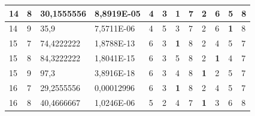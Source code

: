 \documentclass[conference]{IEEEtran}
\begin{document}
\begin{table}[]
\begin{tabular}{|llll|llllllll|}
		\multicolumn{1}{|l|}{14}  & \multicolumn{1}{l|}{8}         & \multicolumn{1}{l|}{30,1555556}    & 8,8919E-05 & \multicolumn{1}{l|}{4}   & \multicolumn{1}{l|}{3}          & \multicolumn{1}{l|}{\textbf{1}} & \multicolumn{1}{l|}{7}   & \multicolumn{1}{l|}{2}          & \multicolumn{1}{l|}{6}          & \multicolumn{1}{l|}{5}          & 8                      \\ \hline
		\multicolumn{1}{|l|}{14}  & \multicolumn{1}{l|}{9}         & \multicolumn{1}{l|}{35,9}          & 7,5711E-06 & \multicolumn{1}{l|}{4}   & \multicolumn{1}{l|}{5}          & \multicolumn{1}{l|}{3}          & \multicolumn{1}{l|}{7}   & \multicolumn{1}{l|}{2}          & \multicolumn{1}{l|}{6}          & \multicolumn{1}{l|}{\textbf{1}} & 8                      \\ \hline
		\multicolumn{1}{|l|}{15}  & \multicolumn{1}{l|}{7}         & \multicolumn{1}{l|}{74,4222222}    & 1,8788E-13 & \multicolumn{1}{l|}{6}   & \multicolumn{1}{l|}{3}          & \multicolumn{1}{l|}{\textbf{1}} & \multicolumn{1}{l|}{8}   & \multicolumn{1}{l|}{2}          & \multicolumn{1}{l|}{4}          & \multicolumn{1}{l|}{5}          & 7                      \\ \hline
		\multicolumn{1}{|l|}{15}  & \multicolumn{1}{l|}{8}         & \multicolumn{1}{l|}{84,3222222}    & 1,8041E-15 & \multicolumn{1}{l|}{6}   & \multicolumn{1}{l|}{3}          & \multicolumn{1}{l|}{5}          & \multicolumn{1}{l|}{8}   & \multicolumn{1}{l|}{2}          & \multicolumn{1}{l|}{\textbf{1}} & \multicolumn{1}{l|}{4}          & 7                      \\ \hline
		\multicolumn{1}{|l|}{15}  & \multicolumn{1}{l|}{9}         & \multicolumn{1}{l|}{97,3}          & 3,8916E-18 & \multicolumn{1}{l|}{6}   & \multicolumn{1}{l|}{3}          & \multicolumn{1}{l|}{4}          & \multicolumn{1}{l|}{8}   & \multicolumn{1}{l|}{\textbf{1}} & \multicolumn{1}{l|}{2}          & \multicolumn{1}{l|}{5}          & 7                      \\ \hline
		\multicolumn{1}{|l|}{16}  & \multicolumn{1}{l|}{7}         & \multicolumn{1}{l|}{29,2555556}    & 0,00012996 & \multicolumn{1}{l|}{6}   & \multicolumn{1}{l|}{3}          & \multicolumn{1}{l|}{\textbf{1}} & \multicolumn{1}{l|}{8}   & \multicolumn{1}{l|}{2}          & \multicolumn{1}{l|}{4}          & \multicolumn{1}{l|}{5}          & 7                      \\ \hline
		\multicolumn{1}{|l|}{16}  & \multicolumn{1}{l|}{8}         & \multicolumn{1}{l|}{40,4666667}    & 1,0246E-06 & \multicolumn{1}{l|}{5}   & \multicolumn{1}{l|}{2}          & \multicolumn{1}{l|}{4}          & \multicolumn{1}{l|}{7}   & \multicolumn{1}{l|}{\textbf{1}} & \multicolumn{1}{l|}{3}          & \multicolumn{1}{l|}{6}          & 8                      \\ \hline

\end{tabular}
\end{table}
\end{document}
